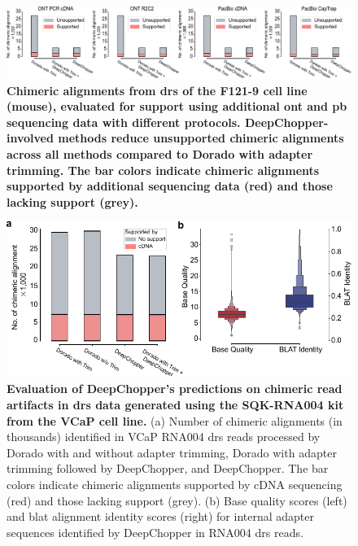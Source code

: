 \documentclass[pdflatex,sn-nature, lineno]{sn-jnl}%
\begin{document}
\begin{figure}[!ht]
	\includegraphics[height=0.21\columnwidth]{finals/sf2}
	\caption{ {\bf Chimeric alignments from \gls{drs} of the F121-9 cell line (mouse), evaluated for support using additional \gls{ont} and \gls{pb} sequencing data with different protocols. DeepChopper-involved methods reduce unsupported chimeric alignments across all methods compared to Dorado with adapter trimming. The bar colors indicate chimeric alignments supported by additional sequencing data (red) and those lacking support (grey).}}\label{fig:sf2}
\end{figure}



\begin{figure}[!ht]
	\includegraphics[height=0.41\columnwidth]{finals/sf3}
	\caption{ {\bf Evaluation of DeepChopper's predictions on chimeric read artifacts in \gls{drs} data generated using the SQK-RNA004 kit from the VCaP cell line.} (a) Number of chimeric alignments (in thousands) identified in VCaP RNA004 \gls{drs} reads processed by Dorado with and without adapter trimming, Dorado with adapter trimming followed by DeepChopper, and DeepChopper. The bar colors indicate chimeric alignments supported by cDNA sequencing (red) and those lacking support (grey). (b) Base quality scores (left) and \gls{blat} alignment identity scores (right) for internal adapter sequences identified by DeepChopper in RNA004 \gls{drs} reads.}\label{fig:sf3}
\end{figure}
\end{document}
